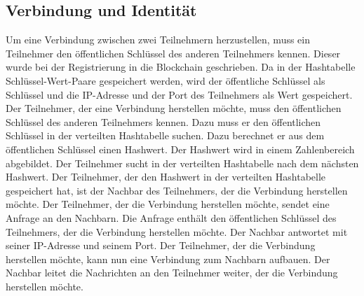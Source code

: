 \subsection{Verbindung und Identität}

Um eine Verbindung zwischen zwei Teilnehmern herzustellen, muss ein Teilnehmer den öffentlichen
Schlüssel des anderen Teilnehmers kennen. Dieser wurde bei der Registrierung in die Blockchain
geschrieben. Da in der Hashtabelle Schlüssel-Wert-Paare gespeichert werden, wird
der öffentliche Schlüssel als Schlüssel und die IP-Adresse und der Port des Teilnehmers als
Wert gespeichert. Der Teilnehmer, der eine Verbindung herstellen möchte, muss den öffentlichen
Schlüssel des anderen Teilnehmers kennen. Dazu muss er den öffentlichen Schlüssel in der
verteilten Hashtabelle suchen. Dazu berechnet er aus dem öffentlichen Schlüssel einen Hashwert.
Der Hashwert wird in einem Zahlenbereich abgebildet. Der Teilnehmer sucht in der verteilten
Hashtabelle nach dem nächsten Hashwert. Der Teilnehmer, der den Hashwert in der verteilten
Hashtabelle gespeichert hat, ist der Nachbar des Teilnehmers, der die Verbindung herstellen
möchte. Der Teilnehmer, der die Verbindung herstellen möchte, sendet eine Anfrage an den
Nachbarn. Die Anfrage enthält den öffentlichen Schlüssel des Teilnehmers, der die Verbindung
herstellen möchte. Der Nachbar antwortet mit seiner IP-Adresse und seinem Port. Der Teilnehmer,
der die Verbindung herstellen möchte, kann nun eine Verbindung zum Nachbarn aufbauen. Der
Nachbar leitet die Nachrichten an den Teilnehmer weiter, der die Verbindung herstellen möchte.